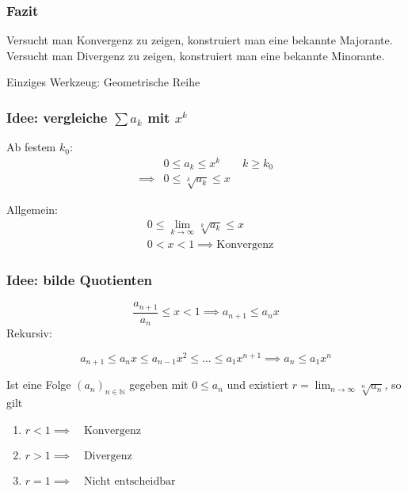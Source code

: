 \subsubsection{Fazit}
Versucht man Konvergenz zu zeigen, konstruiert man eine bekannte Majorante.\newline
Versucht man Divergenz zu zeigen, konstruiert man eine bekannte Minorante. \newline

\noindent Einziges Werkzeug: Geometrische Reihe

\subsubsection*{Idee: vergleiche $ \sum a_k $ mit $x^k$}
Ab festem \( k_0 \):
\begin{align*}
	&0 \leq a_k \leq x^k \qquad k \geq k_0 \\
	\implies &0 \leq \sqrt[k]{a_k} \leq x
\end{align*}

\noindent Allgemein:
\begin{align*}
	&0 \leq \lim_{k\rightarrow\infty} \sqrt[k]{a_k} \leq x \\
	&0 < x < 1 \implies \text{Konvergenz}
\end{align*}

\subsubsection{Idee: bilde Quotienten} %
\label{sub:bilde_quotienten}

\[
	\frac{a_{n+1}}{a_n} \leq x < 1 \implies a_{n+1} \leq a_n x
\]
Rekursiv:

\[
	a_{n+1} \leq a_nx \leq a_{n-1}x^2\leq \ldots \leq a_1x^{n+1} \implies a_n \leq a_1x^n
\]

\begin{theorem}[Wurzelkriterium]
		Ist eine Folge \( (a_n)_{n \in \mathbb{N}} \) gegeben mit \( 0 \leq a_n \) und existiert \( r = \lim_{n\rightarrow\infty} \sqrt[n]{a_n} \), so gilt
		\begin{enumerate}
			\item \( r < 1 \implies \quad \text{Konvergenz} \)
			\item \( r > 1 \implies \quad \text{Divergenz} \)
			\item \( r = 1 \implies \quad \text{Nicht entscheidbar} \)
		\end{enumerate}
\end{theorem}

